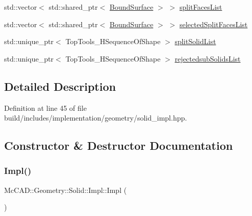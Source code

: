 \begin{DoxyCompactItemize}
\item 
std\+::vector$<$ std\+::shared\+\_\+ptr$<$ \hyperlink{classMcCAD_1_1Geometry_1_1BoundSurface}{Bound\+Surface} $>$ $>$ \hyperlink{classMcCAD_1_1Geometry_1_1Solid_1_1Impl_a642e79e9fa8db428b1c731c100c53517}{split\+Faces\+List}
\item 
std\+::vector$<$ std\+::shared\+\_\+ptr$<$ \hyperlink{classMcCAD_1_1Geometry_1_1BoundSurface}{Bound\+Surface} $>$ $>$ \hyperlink{classMcCAD_1_1Geometry_1_1Solid_1_1Impl_aa19f7056715424c86510c107459209b8}{selected\+Split\+Faces\+List}
\item 
std\+::unique\+\_\+ptr$<$ Top\+Tools\+\_\+\+H\+Sequence\+Of\+Shape $>$ \hyperlink{classMcCAD_1_1Geometry_1_1Solid_1_1Impl_a962b0107f7c5cda9270fdd4e5e0024a3}{split\+Solid\+List}
\item 
std\+::unique\+\_\+ptr$<$ Top\+Tools\+\_\+\+H\+Sequence\+Of\+Shape $>$ \hyperlink{classMcCAD_1_1Geometry_1_1Solid_1_1Impl_a464bf027934dad6084175700222b1582}{rejectedsub\+Solids\+List}
\end{DoxyCompactItemize}


\subsection{Detailed Description}


Definition at line 45 of file build/includes/implementation/geometry/solid\+\_\+impl.\+hpp.



\subsection{Constructor \& Destructor Documentation}
\mbox{\label{classMcCAD_1_1Geometry_1_1Solid_1_1Impl_a0e6034dcecdd2804371ed09fef697e3d}} 
\subsubsection{\texorpdfstring{Impl()}{Impl()}\hspace{0.1cm}{\footnotesize\ttfamily [1/2]}}
{\footnotesize\ttfamily Mc\+C\+A\+D\+::\+Geometry\+::\+Solid\+::\+Impl\+::\+Impl (\begin{DoxyParamCaption}{ }\end{DoxyParamCaption})}



